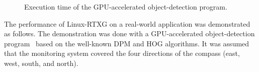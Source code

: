 \begin{figure}[!t]
\begin{minipage}[t]{0.33\hsize}
\begin{center}
\label{fig:real-prio_band}
\label{fig:real-prio_band-hiload}
\end{center}
\end{minipage}
\begin{minipage}[t]{0.33\hsize}
\begin{center}
\label{fig:real-null_null-hiload}
\label{fig:real-prio_band_cpu-hiload}
\end{center}
\end{minipage}
\caption{Execution time of the GPU-accelerated object-detection program.}
\vspace{-4mm}
\label{fig:elapse_time_all}
\end{figure}

The performance of Linux-RTXG on a real-world application was demonstrated as follows.
The demonstration was done with a GPU-accelerated object-detection program~\cite{hirabayashi:cpsna2013} based on the well-known DPM and HOG algorithms.
It was assumed that the monitoring system covered the four directions of the compass (east, west, south, and north).

